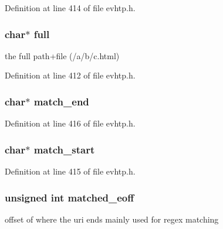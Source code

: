 Definition at line 414 of file evhtp.\-h.

\hypertarget{structevhtp__path__s_a3deff62337b4ec745307f4410d7ff6ce}{
\subsubsection[{full}]{\setlength{\rightskip}{0pt plus 5cm}char$\ast$ full}}\label{structevhtp__path__s_a3deff62337b4ec745307f4410d7ff6ce}
the full path+file (/a/b/c.html) 

Definition at line 412 of file evhtp.\-h.

\hypertarget{structevhtp__path__s_aa1f13c993b57860b101d02bc62bb801b}{
\subsubsection[{match\-\_\-end}]{\setlength{\rightskip}{0pt plus 5cm}char$\ast$ match\-\_\-end}}\label{structevhtp__path__s_aa1f13c993b57860b101d02bc62bb801b}


Definition at line 416 of file evhtp.\-h.

\hypertarget{structevhtp__path__s_a25d9dc60fbb26e1c4898184e1e46e9ab}{
\subsubsection[{match\-\_\-start}]{\setlength{\rightskip}{0pt plus 5cm}char$\ast$ match\-\_\-start}}\label{structevhtp__path__s_a25d9dc60fbb26e1c4898184e1e46e9ab}


Definition at line 415 of file evhtp.\-h.

\hypertarget{structevhtp__path__s_ae9fc73e1697747df74873f20d91db690}{
\subsubsection[{matched\-\_\-eoff}]{\setlength{\rightskip}{0pt plus 5cm}unsigned int matched\-\_\-eoff}}\label{structevhtp__path__s_ae9fc73e1697747df74873f20d91db690}
offset of where the uri ends mainly used for regex matching 

